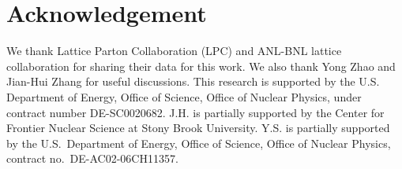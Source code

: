 \documentclass[prd,aps,nofootinbib,superscriptaddress,floatfix,preprintnumbers,twocolumn]{revtex4}
\begin{document}
\section*{Acknowledgement}
We thank Lattice Parton Collaboration (LPC) and ANL-BNL lattice collaboration for sharing their data for this work. We also thank Yong Zhao and Jian-Hui Zhang for useful discussions. This research is supported by the U.S. Department of Energy, Office of Science, Office of Nuclear Physics, under contract number DE-SC0020682. J.H. is partially supported by the Center for Frontier Nuclear Science at Stony Brook University. Y.S. is partially supported by the U.S.~Department of Energy, Office of Science, Office of Nuclear Physics, contract no.~DE-AC02-06CH11357.

%






%
\end{document}
